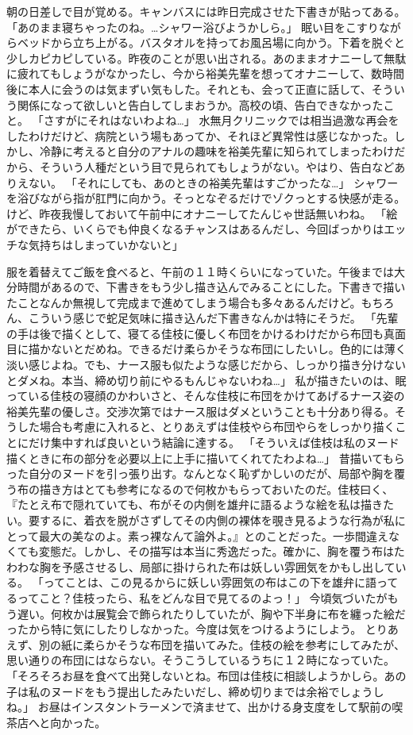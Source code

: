 朝の日差しで目が覚める。キャンバスには昨日完成させた下書きが貼ってある。
「あのまま寝ちゃったのね。…シャワー浴びようかしら。」
眠い目をこすりながらベッドから立ち上がる。バスタオルを持ってお風呂場に向かう。下着を脱ぐと少しカピカピしている。昨夜のことが思い出される。あのままオナニーして無駄に疲れてもしょうがなかったし、今から裕美先輩を想ってオナニーして、数時間後に本人に会うのは気まずい気もした。それとも、会って正直に話して、そういう関係になって欲しいと告白してしまおうか。高校の頃、告白できなかったこと。
「さすがにそれはないわよね…」
水無月クリニックでは相当過激な再会をしたわけだけど、病院という場もあってか、それほど異常性は感じなかった。しかし、冷静に考えると自分のアナルの趣味を裕美先輩に知られてしまったわけだから、そういう人種だという目で見られてもしょうがない。やはり、告白などありえない。
「それにしても、あのときの裕美先輩はすごかったな…」
シャワーを浴びながら指が肛門に向かう。そっとなぞるだけでゾクっとする快感が走る。けど、昨夜我慢しておいて午前中にオナニーしてたんじゃ世話無いわね。
「絵ができたら、いくらでも仲良くなるチャンスはあるんだし、今回ばっかりはエッチな気持ちはしまっていかないと」

服を着替えてご飯を食べると、午前の１１時くらいになっていた。午後までは大分時間があるので、下書きをもう少し描き込んでみることにした。下書きで描いたことなんか無視して完成まで進めてしまう場合も多々あるんだけど。もちろん、こういう感じで蛇足気味に描き込んだ下書きなんかは特にそうだ。
「先輩の手は後で描くとして、寝てる佳枝に優しく布団をかけるわけだから布団も真面目に描かないとだめね。できるだけ柔らかそうな布団にしたいし。色的には薄く淡い感じよね。でも、ナース服も似たような感じだから、しっかり描き分けないとダメね。本当、締め切り前にやるもんじゃないわね…」
私が描きたいのは、眠っている佳枝の寝顔のかわいさと、そんな佳枝に布団をかけてあげるナース姿の裕美先輩の優しさ。交渉次第ではナース服はダメということも十分あり得る。そうした場合も考慮に入れると、とりあえずは佳枝やら布団やらをしっかり描くことにだけ集中すれば良いという結論に達する。
「そういえば佳枝は私のヌード描くときに布の部分を必要以上に上手に描いてくれてたわよね…」
昔描いてもらった自分のヌードを引っ張り出す。なんとなく恥ずかしいのだが、局部や胸を覆う布の描き方はとても参考になるので何枚かもらっておいたのだ。佳枝曰く、『たとえ布で隠れていても、布がその内側を雄弁に語るような絵を私は描きたい。要するに、着衣を脱がさずしてその内側の裸体を覗き見るような行為が私にとって最大の美なのよ。素っ裸なんて論外よ。』とのことだった。一歩間違えなくても変態だ。しかし、その描写は本当に秀逸だった。確かに、胸を覆う布はたわわな胸を予感させるし、局部に掛けられた布は妖しい雰囲気をかもし出している。
「ってことは、この見るからに妖しい雰囲気の布はこの下を雄弁に語ってるってこと？佳枝ったら、私をどんな目で見てるのよっ！」
今頃気づいたがもう遅い。何枚かは展覧会で飾られたりしていたが、胸や下半身に布を纏った絵だったから特に気にしたりしなかった。今度は気をつけるようにしよう。
とりあえず、別の紙に柔らかそうな布団を描いてみた。佳枝の絵を参考にしてみたが、思い通りの布団にはならない。そうこうしているうちに１２時になっていた。
「そろそろお昼を食べて出発しないとね。布団は佳枝に相談しようかしら。あの子は私のヌードをもう提出したみたいだし、締め切りまでは余裕でしょうしね。」
お昼はインスタントラーメンで済ませて、出かける身支度をして駅前の喫茶店へと向かった。


